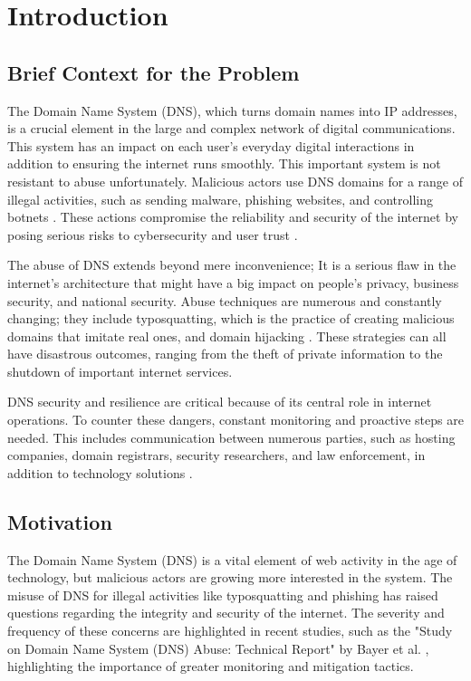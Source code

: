 \chapter{Introduction}


\section{Brief Context for the Problem}

The Domain Name System (DNS), which turns domain names into IP addresses, is a crucial element in the large and complex network of digital communications. This system has an impact on each user's everyday digital interactions in addition to ensuring the internet runs smoothly. This important system is not resistant to abuse unfortunately. Malicious actors use DNS domains for a range of illegal activities, such as sending malware, phishing websites, and controlling botnets \cite{so2022}. These actions compromise the reliability and security of the internet by posing serious risks to cybersecurity and user trust \cite{bayer2022}.

The abuse of DNS extends beyond mere inconvenience; It is a serious flaw in the internet's architecture that might have a big impact on people's privacy, business security, and national security. Abuse techniques are numerous and constantly changing; they include typosquatting, which is the practice of creating malicious domains that imitate real ones, and domain hijacking \cite{tatang2021}. These strategies can all have disastrous outcomes, ranging from the theft of private information to the shutdown of important internet services.

DNS security and resilience are critical because of its central role in internet operations. To counter these dangers, constant monitoring and proactive steps are needed. This includes communication between numerous parties, such as hosting companies, domain registrars, security researchers, and law enforcement, in addition to technology solutions \cite{holdmann2019}.

\section{Motivation}

The Domain Name System (DNS) is a vital element of web activity in the age of technology, but malicious actors are growing more interested in the system. The misuse of DNS for illegal activities like typosquatting and phishing has raised questions regarding the integrity and security of the internet. The severity and frequency of these concerns are highlighted in recent studies, such as the "Study on Domain Name System (DNS) Abuse: Technical Report" by Bayer et al. \cite{bayer2022}, highlighting the importance of greater monitoring and mitigation tactics.

